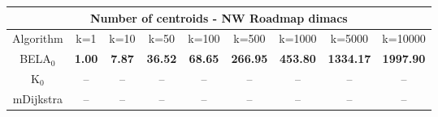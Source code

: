 \begin{tabular}{c|cccccccc}\toprule
\multicolumn{9}{c}{Number of centroids - NW Roadmap dimacs}\\ \midrule
Algorithm & k=1 & k=10 & k=50 & k=100 & k=500 & k=1000 & k=5000 & k=10000 \\ \midrule
BELA$_0$ & \textbf{1.00} & \textbf{7.87} & \textbf{36.52} & \textbf{68.65} & \textbf{266.95} & \textbf{453.80} & \textbf{1334.17} & \textbf{1997.90} \\
K$_0$ & -- & -- & -- & -- & -- & -- & -- & -- \\
mDijkstra & -- & -- & -- & -- & -- & -- & -- & -- \\ \bottomrule 
\end{tabular}
